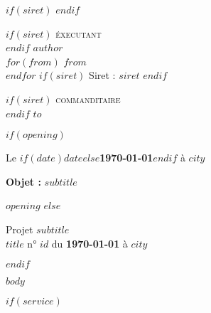 \documentclass{sources/class}
\begin{document}
$if(siret)$
  \logo
$endif$

\begin{multicols}{2}
  $if(siret)$
    {\small \textsc{éxecutant}}\\
  $endif$
  \textbf{$author$}\\
  $for(from)$
  $from$\\
  $endfor$
  $if(siret)$
    {\footnotesize Siret : $siret$}
  $endif$

  \begin{flushright}
    $if(siret)$
      {\small \textsc{commanditaire}}\\
    $endif$
    $to$
  \end{flushright}
\end{multicols}

$if(opening)$
  \begin{flushright}
    Le \textbf{$if(date)$$date$$else$\today{}$endif$} à $city$\hspace*{72pt}
  \end{flushright}
  \vspace{2em}

  \textbf{Objet :} $subtitle$
  \vspace{2em}

  \setlength{\parindent}{24pt}
  $opening$
  \setlength{\parindent}{0pt}
  \vspace{1em}
$else$
  \hr

  Projet \textbf{$subtitle$}\\
  $title$ n° \textbf{$id$} du \textbf{\today{}} à $city$

  \hr
$endif$

$body$

$if(service)$
  \hr
  \STsetdecimalsep{,}
  \renewcommand\STprintnum[1]{\numprint{#1}}
\end{document}
